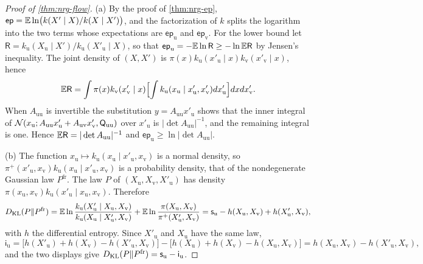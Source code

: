 \begin{proof}[Proof of \cref{thm:nrg-flow}]
(a) By the proof of \cref{thm:nrg-ep}, $\mathsf{ep}=\mathbb{E}\ln\bigl(k(X'\mid X)/k(X\mid X')\bigr)$, and the factorization of $k$ splits the logarithm into the two terms whose expectations are $\mathsf{ep}_{\mathrm u}$ and $\mathsf{ep}_{\mathrm v}$. For the lower bound let $\mathsf R=k_{\mathrm u}(X_{\mathrm u}\mid X')/k_{\mathrm u}(X'_{\mathrm u}\mid X)$, so that $\mathsf{ep}_{\mathrm u}=-\mathbb{E}\ln\mathsf R\ge-\ln\mathbb{E}\mathsf R$ by Jensen's inequality. The joint density of $(X,X')$ is $\pi(x)k_{\mathrm u}(x'_{\mathrm u}\mid x)k_{\mathrm v}(x'_{\mathrm v}\mid x)$, hence
\[
\mathbb{E}\mathsf R=\int\pi(x)k_{\mathrm v}(x'_{\mathrm v}\mid x)\Bigl[\int k_{\mathrm u}(x_{\mathrm u}\mid x'_{\mathrm u},x'_{\mathrm v})dx'_{\mathrm u}\Bigr]dxdx'_{\mathrm v}.
\]
When $A_{\mathrm{uu}}$ is invertible the substitution $y=A_{\mathrm{uu}}x'_{\mathrm u}$ shows that the inner integral of $\mathcal{N}(x_{\mathrm u};A_{\mathrm{uu}}x'_{\mathrm u}+A_{\mathrm{uv}}x'_{\mathrm v},\mathsf Q_{\mathrm{uu}})$ over $x'_{\mathrm u}$ is $\vert\det A_{\mathrm{uu}}\vert^{-1}$, and the remaining integral is one. Hence $\mathbb{E}\mathsf R=\vert\det A_{\mathrm{uu}}\vert^{-1}$ and $\mathsf{ep}_{\mathrm u}\ge\ln\vert\det A_{\mathrm{uu}}\vert$.

(b) The function $x_{\mathrm u}\mapsto k_{\mathrm u}(x_{\mathrm u}\mid x'_{\mathrm u},x_{\mathrm v})$ is a normal density, so $\pi^+(x'_{\mathrm u},x_{\mathrm v})k_{\mathrm u}(x_{\mathrm u}\mid x'_{\mathrm u},x_{\mathrm v})$ is a probability density, that of the nondegenerate Gaussian law $P^{\mathrm{fr}}$. The law $P$ of $(X_{\mathrm u},X_{\mathrm v},X'_{\mathrm u})$ has density $\pi(x_{\mathrm u},x_{\mathrm v})k_{\mathrm u}(x'_{\mathrm u}\mid x_{\mathrm u},x_{\mathrm v})$. Therefore
\[
D_{\mathrm{KL}}(P\Vert P^{\mathrm{fr}})=\mathbb{E}\ln\frac{k_{\mathrm u}(X'_{\mathrm u}\mid X_{\mathrm u},X_{\mathrm v})}{k_{\mathrm u}(X_{\mathrm u}\mid X'_{\mathrm u},X_{\mathrm v})}+\mathbb{E}\ln\frac{\pi(X_{\mathrm u},X_{\mathrm v})}{\pi^+(X'_{\mathrm u},X_{\mathrm v})}=\mathsf s_{\mathrm u}-h(X_{\mathrm u},X_{\mathrm v})+h(X'_{\mathrm u},X_{\mathrm v}),
\]
with $h$ the differential entropy. Since $X'_{\mathrm u}$ and $X_{\mathrm u}$ have the same law,
\[
\mathsf i_{\mathrm u}=\bigl[h(X'_{\mathrm u})+h(X_{\mathrm v})-h(X'_{\mathrm u},X_{\mathrm v})\bigr]-\bigl[h(X_{\mathrm u})+h(X_{\mathrm v})-h(X_{\mathrm u},X_{\mathrm v})\bigr]=h(X_{\mathrm u},X_{\mathrm v})-h(X'_{\mathrm u},X_{\mathrm v}),
\]
and the two displays give $D_{\mathrm{KL}}(P\Vert P^{\mathrm{fr}})=\mathsf s_{\mathrm u}-\mathsf i_{\mathrm u}$.


\end{proof}

